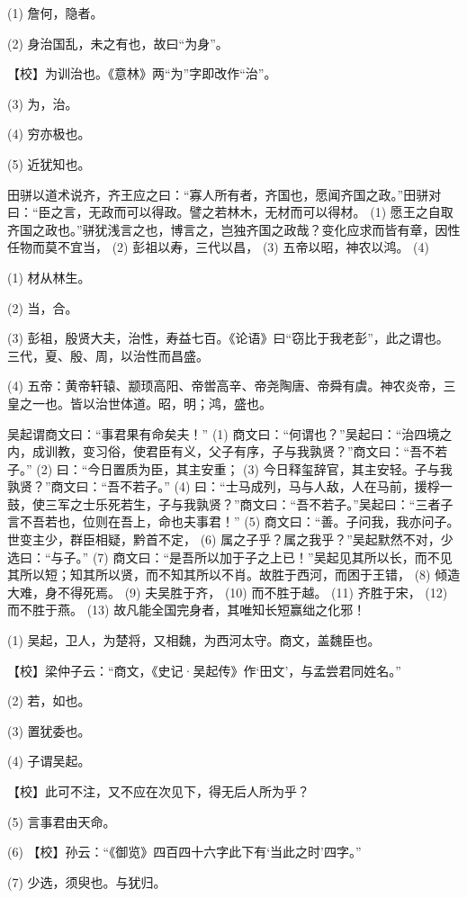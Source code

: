 \documentclass[12pt,UTF8]{ctexbook}
\begin{document}
(1) 詹何，隐者。

(2) 身治国乱，未之有也，故曰“为身”。

【校】为训治也。《意林》两“为”字即改作“治”。

(3) 为，治。

(4) 穷亦极也。

(5) 近犹知也。

田骈以道术说齐，齐王应之曰：“寡人所有者，齐国也，愿闻齐国之政。”田骈对曰：“臣之言，无政而可以得政。譬之若林木，无材而可以得材。 (1) 愿王之自取齐国之政也。”骈犹浅言之也，博言之，岂独齐国之政哉？变化应求而皆有章，因性任物而莫不宜当， (2) 彭祖以寿，三代以昌， (3) 五帝以昭，神农以鸿。 (4)

(1) 材从林生。

(2) 当，合。

(3) 彭祖，殷贤大夫，治性，寿益七百。《论语》曰“窃比于我老彭”，此之谓也。三代，夏、殷、周，以治性而昌盛。

(4) 五帝：黄帝轩辕、颛顼高阳、帝喾高辛、帝尧陶唐、帝舜有虞。神农炎帝，三皇之一也。皆以治世体道。昭，明；鸿，盛也。

吴起谓商文曰：“事君果有命矣夫！” (1) 商文曰：“何谓也？”吴起曰：“治四境之内，成训教，变习俗，使君臣有义，父子有序，子与我孰贤？”商文曰：“吾不若子。” (2) 曰：“今日置质为臣，其主安重； (3) 今日释玺辞官，其主安轻。子与我孰贤？”商文曰：“吾不若子。” (4) 曰：“士马成列，马与人敌，人在马前，援桴一鼓，使三军之士乐死若生，子与我孰贤？”商文曰：“吾不若子。”吴起曰：“三者子言不吾若也，位则在吾上，命也夫事君！” (5) 商文曰：“善。子问我，我亦问子。世变主少，群臣相疑，黔首不定， (6) 属之子乎？属之我乎？”吴起默然不对，少选曰：“与子。” (7) 商文曰：“是吾所以加于子之上已！”吴起见其所以长，而不见其所以短；知其所以贤，而不知其所以不肖。故胜于西河，而困于王错， (8) 倾造大难，身不得死焉。 (9) 夫吴胜于齐， (10) 而不胜于越。 (11) 齐胜于宋， (12) 而不胜于燕。 (13) 故凡能全国完身者，其唯知长短赢绌之化邪！

(1) 吴起，卫人，为楚将，又相魏，为西河太守。商文，盖魏臣也。

【校】梁仲子云：“商文，《史记·吴起传》作‘田文’，与孟尝君同姓名。”

(2) 若，如也。

(3) 置犹委也。

(4) 子谓吴起。

【校】此可不注，又不应在次见下，得无后人所为乎？

(5) 言事君由天命。

(6) 【校】孙云：“《御览》四百四十六字此下有‘当此之时’四字。”

(7) 少选，须臾也。与犹归。
\end{document}
